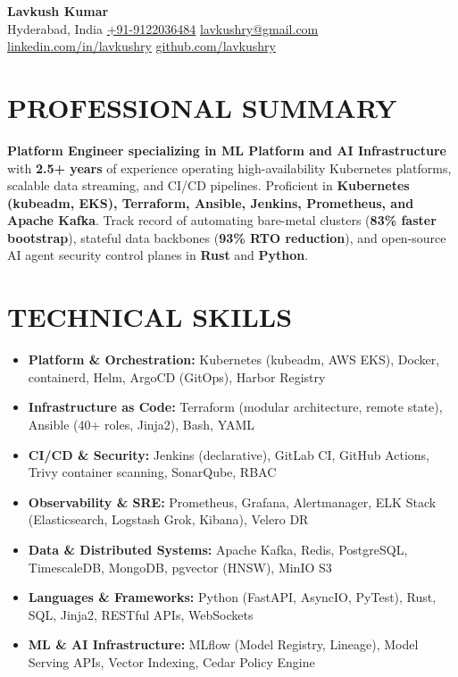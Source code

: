 \documentclass[a4paper,10pt]{article}
\begin{document}
\begin{center}
  {\fontsize{19}{21}\selectfont\bfseries\color{navy} Lavkush Kumar}\\[2.5pt]
  \small\color{soft}
  Hyderabad, India \;\textbar\; 
  \href{tel:+919122036484}{\color{accent}+91-9122036484} \;\textbar\; 
  \href{mailto:lavkushry@gmail.com}{\color{accent}lavkushry@gmail.com} \;\textbar\; 
  \href{https://linkedin.com/in/lavkushry}{\color{accent}linkedin.com/in/lavkushry} \;\textbar\; 
  \href{https://github.com/lavkushry}{\color{accent}github.com/lavkushry}
\end{center}
\vspace{-6pt}

\section{PROFESSIONAL SUMMARY}
\small\color{black}
\textbf{Platform Engineer specializing in ML Platform and AI Infrastructure} with \textbf{2.5+ years} of experience operating high-availability Kubernetes platforms, scalable data streaming, and CI/CD pipelines. Pro{f}icient in \textbf{Kubernetes (kubeadm, EKS), Terraform, Ansible, Jenkins, Prometheus, and Apache Kafka}. Track record of automating bare-metal clusters (\textbf{83\% faster bootstrap}), stateful data backbones (\textbf{93\% RTO reduction}), and open-source AI agent security control planes in \textbf{Rust} and \textbf{Python}.

\section{TECHNICAL SKILLS}
\begin{itemize}[leftmargin=0.0in, label={}, noitemsep, topsep=0.5pt, parsep=1.2pt, partopsep=0pt]
  \item \small \textbf{\color{navy}Platform \& Orchestration:} Kubernetes (kubeadm, AWS EKS), Docker, containerd, Helm, ArgoCD (GitOps), Harbor Registry
  \item \small \textbf{\color{navy}Infrastructure as Code:} Terraform (modular architecture, remote state), Ansible (40+ roles, Jinja2), Bash, YAML
  \item \small \textbf{\color{navy}CI/CD \& Security:} Jenkins (declarative), GitLab CI, GitHub Actions, Trivy container scanning, SonarQube, RBAC
  \item \small \textbf{\color{navy}Observability \& SRE:} Prometheus, Grafana, Alertmanager, ELK Stack (Elasticsearch, Logstash Grok, Kibana), Velero DR
  \item \small \textbf{\color{navy}Data \& Distributed Systems:} Apache Kafka, Redis, PostgreSQL, TimescaleDB, MongoDB, pgvector (HNSW), MinIO S3
  \item \small \textbf{\color{navy}Languages \& Frameworks:} Python (FastAPI, AsyncIO, PyTest), Rust, SQL, Jinja2, RESTful APIs, WebSockets
  \item \small \textbf{\color{navy}ML \& AI Infrastructure:} ML{f}low (Model Registry, Lineage), Model Serving APIs, Vector Indexing, Cedar Policy Engine
\end{itemize}
\end{document}
